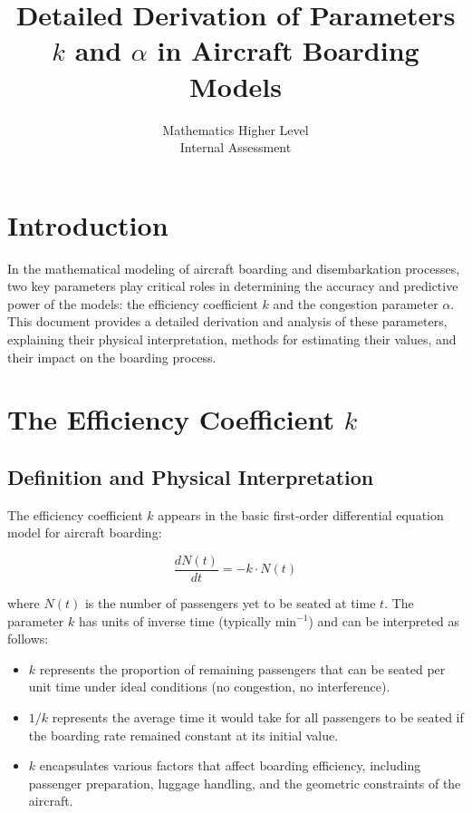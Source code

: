 \documentclass[12pt,a4paper]{article}
\title{Detailed Derivation of Parameters $k$ and $\alpha$ in Aircraft Boarding Models}
\author{Mathematics Higher Level \\
Internal Assessment}
\date{}
\begin{document}
\maketitle

\section{Introduction}

In the mathematical modeling of aircraft boarding and disembarkation processes, two key parameters play critical roles in determining the accuracy and predictive power of the models: the efficiency coefficient $k$ and the congestion parameter $\alpha$. This document provides a detailed derivation and analysis of these parameters, explaining their physical interpretation, methods for estimating their values, and their impact on the boarding process.

\section{The Efficiency Coefficient $k$}

\subsection{Definition and Physical Interpretation}

The efficiency coefficient $k$ appears in the basic first-order differential equation model for aircraft boarding:

\begin{equation}
\frac{dN(t)}{dt} = -k \cdot N(t)
\end{equation}

where $N(t)$ is the number of passengers yet to be seated at time $t$. The parameter $k$ has units of inverse time (typically $\text{min}^{-1}$) and can be interpreted as follows:

\begin{itemize}
    \item $k$ represents the proportion of remaining passengers that can be seated per unit time under ideal conditions (no congestion, no interference).
    \item $1/k$ represents the average time it would take for all passengers to be seated if the boarding rate remained constant at its initial value.
    \item $k$ encapsulates various factors that affect boarding efficiency, including passenger preparation, luggage handling, and the geometric constraints of the aircraft.
\end{itemize}
\end{document}

